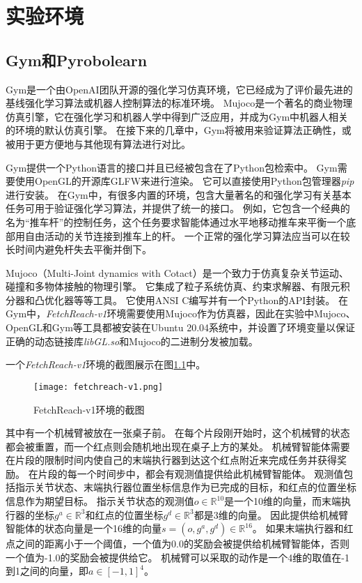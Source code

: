 
\chapter{实验环境}

\section{Gym和Pyrobolearn}\label{introenv}
Gym\cite{brockman2016openai}是一个由OpenAI团队开源的强化学习仿真环境，它已经成为了评价最先进的基线强化学习算法或机器人控制算法的标准环境。
Mujoco\cite{todorov2012mujoco}是一个著名的商业物理仿真引擎，它在强化学习和机器人学中得到广泛应用，并成为Gym中机器人相关的环境的默认仿真引擎。
在接下来的几章中，Gym将被用来验证算法正确性，或被用于更方便地与其他现有算法进行对比。

Gym提供一个Python语言的接口并且已经被包含在了Python包检索中。
Gym需要使用OpenGL的开源库GLFW来进行渲染。
它可以直接使用Python包管理器\emph{pip}进行安装。
在Gym中，有很多内置的环境，包含大量著名的和强化学习有关基本任务可用于验证强化学习算法，并提供了统一的接口。
例如，它包含一个经典的名为“推车杆”的控制任务，这个任务要求智能体通过水平地移动推车来平衡一个底部用自由活动的关节连接到推车上的杆。
一个正常的强化学习算法应当可以在较长时间内避免杆失去平衡并倒下。

Mujoco（Multi-Joint dynamics with Cotact）是一个致力于仿真复杂关节运动、碰撞和多物体接触的物理引擎。
它集成了粒子系统仿真、约束求解器、有限元积分器和凸优化器等等工具。
它使用ANSI C编写并有一个Python的API封装。
在Gym中，\emph{FetchReach-v1}环境需要使用Mujoco作为仿真器，因此在实验中Mujoco、OpenGL和Gym等工具都被安装在Ubuntu 20.04系统中，并设置了环境变量以保证正确的动态链接库\emph{libGL.so}和Mujoco的二进制分发被加载。

一个\emph{FetchReach-v1}环境的截图展示在图\ref{fetchreach-v1}中。
    \begin{figure}
        \centering
        \texttt{[image: fetchreach-v1.png]}
        \caption{FetchReach-v1环境的截图}
        \label{fetchreach-v1}
    \end{figure}
其中有一个机械臂被放在一张桌子前。
在每个片段刚开始时，这个机械臂的状态都会被重置，而一个红点则会随机地出现在桌子上方的某处。
机械臂智能体需要在片段的限制时间内使自己的末端执行器到达这个红点附近来完成任务并获得奖励。
在片段的每一个时间步中，都会有观测值提供给此机械臂智能体。
观测值包括指示关节状态、末端执行器位置坐标信息作为已完成的目标，和红点的位置坐标信息作为期望目标。
指示关节状态的观测值$o\in \mathbb R^{10}$是一个10维的向量，而末端执行器的坐标$g^a \in \mathbb R^3$和红点的位置坐标$g^d\in\mathbb R^3$都是3维的向量。
因此提供给机械臂智能体的状态向量是一个16维的向量$s=(o, g^a, g^d)\in \mathbb R^{16}$。
如果末端执行器和红点之间的距离小于一个阈值，一个值为0.0的奖励会被提供给机械臂智能体，否则一个值为-1.0的奖励会被提供给它。
机械臂可以采取的动作是一个4维的取值在-1到1之间的向量，即$a\in[-1,1]^4$。

